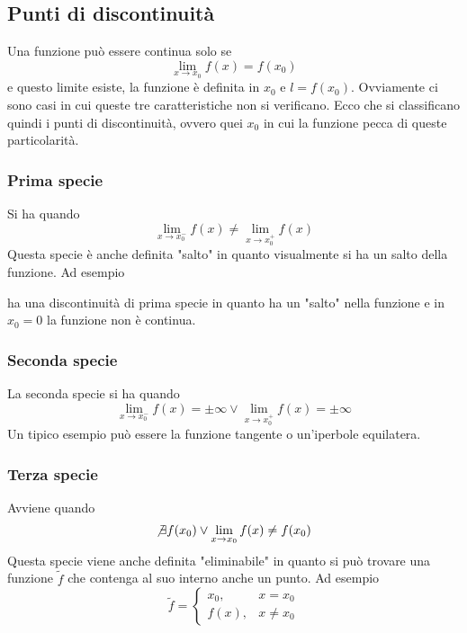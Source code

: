 \subsection{Punti di discontinuità}
Una funzione può essere continua solo se
\begin{equation*}
  \lim\limits_{x\to x_0}f(x)=f(x_0) 
\end{equation*}
e questo limite esiste, la funzione è definita in $x_0$ e $l=f(x_0)$. Ovviamente ci sono casi in
cui queste tre caratteristiche non si verificano. Ecco che si classificano quindi i punti di
discontinuità, ovvero quei $x_0$ in cui la funzione pecca di queste particolarità.

\subsubsection{Prima specie}
Si ha quando
\begin{equation*}
  \lim\limits_{x\to x_0^-}f(x) \neq \lim\limits_{x\to x_0^+}f(x) 
\end{equation*}
Questa specie è anche definita "salto" in quanto visualmente si ha un salto della funzione. Ad
esempio
\begin{center}
\end{center}
ha una discontinuità di prima specie in quanto ha un "salto" nella funzione e in $x_0=0$ la 
funzione non è continua.

\subsubsection{Seconda specie}
La seconda specie si ha quando
\begin{equation*}
  \lim\limits_{x\to x_0^-}f(x) = \pm\infty \lor \lim\limits_{x\to x_0^+}f(x) = \pm\infty
\end{equation*}
Un tipico esempio può essere la funzione tangente o un'iperbole equilatera.

\subsubsection{Terza specie}
Avviene quando
\begin{equation*}
  \not\exists f(x_0) \lor \lim\limits_{x\to x_0} f(x) \neq f(x_0)
\end{equation*}
Questa specie viene anche definita "eliminabile" in quanto si può trovare una funzione 
$\tilde{f}$ che contenga al suo interno anche un punto. Ad esempio
\begin{equation*}
  \tilde{f} =
  \begin{cases}
    x_0,\,& x = x_0\\
    f(x),& x\neq x_0
  \end{cases}
\end{equation*}

